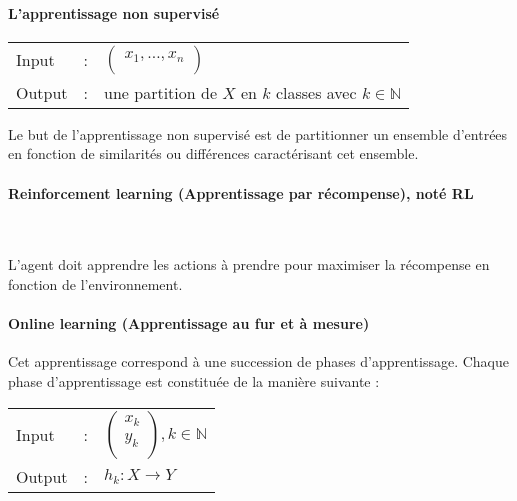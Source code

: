 \documentclass{article}
\begin{document}
    \paragraph{L'apprentissage non supervisé}
        \begin{tabular}{l c l}
         Input & : & $\begin{pmatrix}
                         x_1, \dots, x_n \\
                     \end{pmatrix}$\\
        Output & : & une partition de $X$ en $k$ classes avec $k \in \mathbb{N}$\\
        \end{tabular}


        Le but de l'apprentissage non supervisé est de partitionner un ensemble
        d'entrées en fonction de similarités ou différences caractérisant cet
        ensemble.

    \paragraph{Reinforcement learning (Apprentissage par récompense), noté RL}~\\

        \begin{center}
    \end{center}

        L'agent doit apprendre les actions à prendre pour maximiser la récompense
        en fonction de l'environnement.

    \paragraph{Online learning (Apprentissage au fur et à mesure)} Cet apprentissage
    correspond à une succession de phases d'apprentissage. Chaque phase d'apprentissage est constituée de la manière suivante : \\
    \begin{tabular}{l c l}
     Input & : & $\begin{pmatrix}
                     x_k \\
                     y_k \\
                     \end{pmatrix}, k\in \mathbb{N}$ \\
    Output & : & $h_k : X \rightarrow Y$\\
    \end{tabular}
\end{document}
